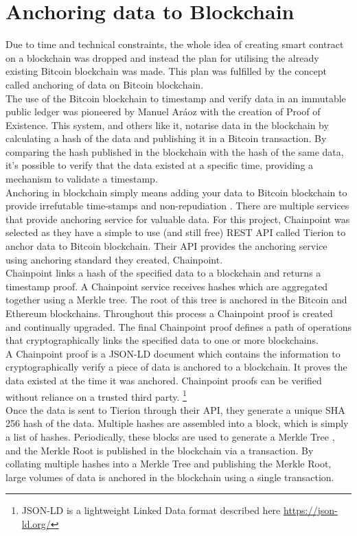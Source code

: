 \section{Anchoring data to Blockchain}
Due to time and technical constraints, the whole idea of creating smart contract on a blockchain was dropped and instead the plan for utilising the already existing Bitcoin blockchain was made. This plan was fulfilled by the concept called anchoring of data on Bitcoin blockchain.
\\The use of the Bitcoin blockchain to timestamp and verify data in an immutable public ledger was pioneered by Manuel Aráoz with the creation of Proof of Existence\cite{Araoz2013ProofExistence}. This system, and others like it, notarise data in the blockchain by calculating a hash of the data and publishing it in a Bitcoin transaction. By comparing the hash published in the blockchain with the hash of the same data, it's possible to verify that the data existed at a specific time, providing a mechanism to validate a timestamp.
\\Anchoring in blockchain simply means adding your data to Bitcoin blockchain to provide irrefutable time-stamps and non-repudiation \cite{Lemieux2017Blockchain:}. There are multiple services that provide anchoring service for valuable data. For this project, Chainpoint was selected as they have a simple to use (and still free) REST API called Tierion to anchor data to Bitcoin blockchain. Their API provides the anchoring service using anchoring standard they created, Chainpoint.
\\Chainpoint links a hash of the specified data to a blockchain and returns a timestamp proof. A Chainpoint service receives hashes which are aggregated together using a Merkle tree. The root of this tree is anchored in the Bitcoin and Ethereum blockchains. Throughout this process a Chainpoint proof is created and continually upgraded. The final Chainpoint proof defines a path of operations that cryptographically links the specified data to one or more blockchains.\cite{ChainpointStandard}
\\A Chainpoint proof is a JSON-LD document which contains the information to cryptographically verify a piece of data is anchored to a blockchain. It proves the data existed at the time it was anchored. Chainpoint proofs can be verified without reliance on a trusted third party.
\footnote{JSON-LD is a lightweight Linked Data format described here \url{https://json-ld.org/}}
\\Once the data is sent to Tierion through their API, they generate a unique SHA 256 hash of the data. Multiple hashes are assembled into a block, which is simply a list of hashes. Periodically, these blocks are used to generate a Merkle Tree\cite{Merkle1980ProtocolsCryptosystems} , and the Merkle Root is published in the blockchain via a transaction. By collating multiple hashes into a Merkle Tree and publishing the Merkle Root, large volumes of data is anchored in the blockchain using a single transaction. \cite{Wayne2016Chainpoint:Receipts}

